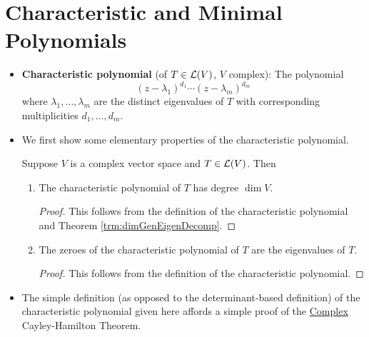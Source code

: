 \documentclass[../main.tex]{subfiles}
\begin{document}
\section{Characteristic and Minimal Polynomials}
\begin{itemize}
    \item \textbf{Characteristic polynomial} (of $T\in\mathcal{L}(V)$, $V$ complex): The polynomial
    \begin{equation*}
        (z-\lambda_1)^{d_1}\cdots(z-\lambda_m)^{d_m}
    \end{equation*}
    where $\lambda_1,\dots,\lambda_m$ are the distinct eigenvalues of $T$ with corresponding multiplicities $d_1,\dots,d_m$.
    \item We first show some elementary properties of the characteristic polynomial.
    \begin{theorem}\label{trm:charPolProperties}
        Suppose $V$ is a complex vector space and $T\in\mathcal{L}(V)$. Then
        \begin{enumerate}[label={\textup{(}\alph*\textup{)}},ref={\thetheorem\alph*}]
            \item \label{trm:charPolPropertiesa}The characteristic polynomial of $T$ has degree $\dim V$.
            \begin{proof}
                This follows from the definition of the characteristic polynomial and Theorem \ref{trm:dimGenEigenDecomp}.
            \end{proof}
            \item \label{trm:charPolPropertiesb}The zeroes of the characteristic polynomial of $T$ are the eigenvalues of $T$.
            \begin{proof}
                This follows from the definition of the characteristic polynomial.
            \end{proof}
        \end{enumerate}
    \end{theorem}
    \item The simple definition (as opposed to the determinant-based definition) of the characteristic polynomial given here affords a simple proof of the \hyperref[trm:ComplexCayleyHamilton]{Complex} Cayley-Hamilton Theorem.
    \begin{theorem}\label{trm:ComplexCayleyHamilton}

\end{theorem}
\end{itemize}
\end{document}
